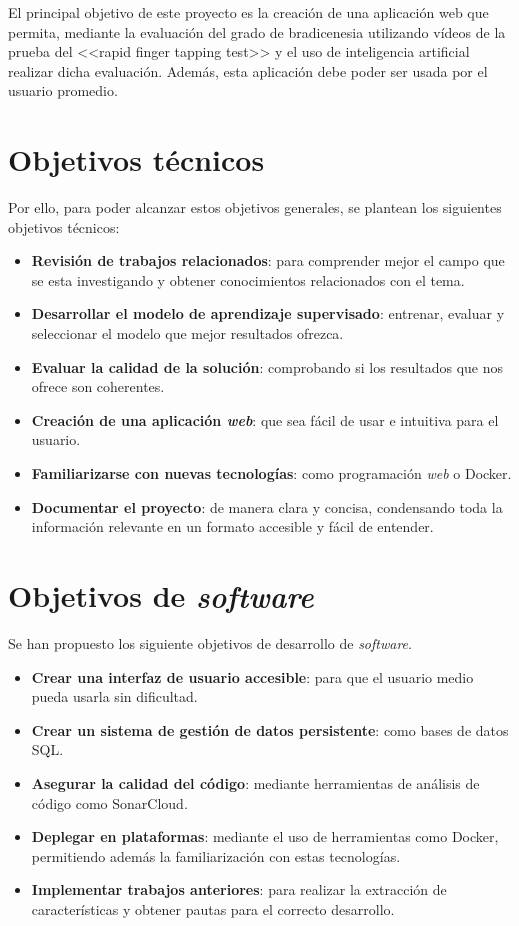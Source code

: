 
El principal objetivo de este proyecto es la creación de una aplicación web que permita, mediante la evaluación del grado de bradicenesia utilizando vídeos de la prueba del <<rapid finger tapping test>> y el uso de inteligencia artificial realizar dicha evaluación. Además, esta aplicación debe poder ser usada por el usuario promedio.


\section{Objetivos técnicos}

Por ello, para poder alcanzar estos objetivos generales, se plantean los siguientes objetivos técnicos:
\begin{itemize}
\item \textbf{Revisión de trabajos relacionados}: para comprender mejor el campo que se esta investigando y obtener conocimientos relacionados con el tema.
\item \textbf{Desarrollar el modelo de aprendizaje supervisado}: entrenar, evaluar y seleccionar el modelo que mejor resultados ofrezca.
\item \textbf{Evaluar la calidad de la solución}: comprobando si los resultados que nos ofrece son coherentes.
\item \textbf{Creación de una aplicación \textit{web}}: que sea fácil de usar e intuitiva para el usuario.
\item \textbf{Familiarizarse con nuevas tecnologías}: como programación \textit{web} o Docker.
\item \textbf{Documentar el proyecto}: de manera clara y concisa, condensando toda la información relevante en un formato accesible y fácil de entender.
\end{itemize}

\section{Objetivos de \textit{software}}

Se han propuesto los siguiente objetivos de desarrollo de \textit{software}.
\begin{itemize}
\item \textbf{Crear una interfaz de usuario accesible}: para que el usuario medio pueda usarla sin dificultad.
\item \textbf{Crear un sistema de gestión de datos persistente}: como bases de datos SQL.
\item \textbf{Asegurar la calidad del código}: mediante herramientas de análisis de código como SonarCloud.
\item \textbf{Deplegar en plataformas}: mediante el uso de herramientas como Docker, permitiendo además la familiarización con estas tecnologías.
\item \textbf{Implementar trabajos anteriores}: para realizar la extracción de características y obtener pautas para el correcto desarrollo.
\end{itemize}